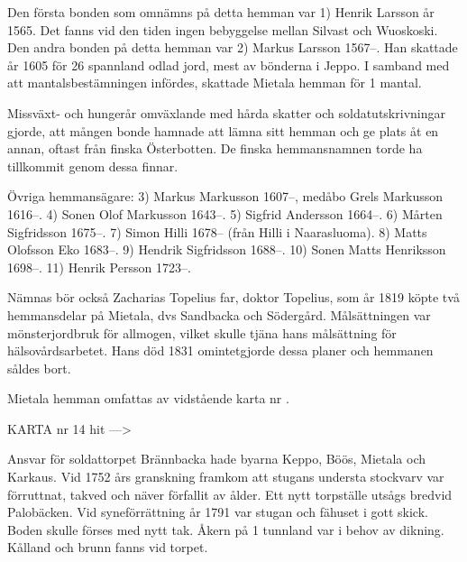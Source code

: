 
Den första bonden som omnämns på detta hemman var 1) Henrik Larsson år 1565. Det fanns vid den tiden ingen bebyggelse mellan Silvast och Wuoskoski. Den andra bonden på detta hemman var 2) Markus Larsson 1567--. Han skattade år 1605 för 26 spannland odlad jord, mest av bönderna i Jeppo. I samband med att mantalsbestämningen infördes, skattade Mietala hemman för 1 mantal.

Missväxt- och hungerår omväxlande med hårda skatter och soldatutskrivningar gjorde, att mången bonde hamnade att lämna sitt hemman och ge plats åt en annan, oftast från finska Österbotten. De finska hemmansnamnen torde ha tillkommit genom dessa finnar.

Övriga hemmansägare:  3) Markus Markusson 1607--, medåbo Grels Markusson 1616--. 4) Sonen Olof Markusson 1643--. 5) Sigfrid Andersson 1664--. 6) Mårten Sigfridsson 1675--. 7) Simon Hilli 1678-- (från Hilli i Naarasluoma). 8) Matts Olofsson Eko 1683--. 9) Hendrik Sigfridsson 1688--. 10) Sonen Matts Henriksson 1698--. 11) Henrik Persson 1723--.

Nämnas bör också  Zacharias Topelius far, doktor Topelius, som år 1819 köpte två hemmansdelar på Mietala, dvs Sandbacka och Södergård. Målsättningen var mönsterjordbruk för allmogen, vilket skulle tjäna hans målsättning för hälsovårdsarbetet. Hans död 1831 omintetgjorde dessa planer och hemmanen såldes bort.


Mietala hemman omfattas av vidstående karta nr .


KARTA nr 14 hit --->



Ansvar för soldattorpet Brännbacka hade byarna Keppo, Böös, Mietala och Karkaus. Vid 1752 års granskning framkom att stugans understa stockvarv var förruttnat, takved och näver förfallit av ålder. Ett nytt torpställe utsågs bredvid Palobäcken. Vid syneförrättning år 1791 var stugan och fähuset i gott skick. Boden skulle förses med nytt tak. Åkern på 1
tunnland var i behov av dikning. Kålland och brunn fanns vid torpet.

